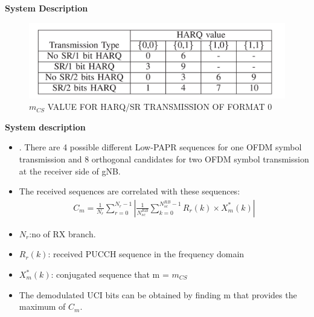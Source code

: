 \documentclass{beamer}
\begin{document}
\begin{frame}{\textbf{System Description}}
\begin{figure}
    \centering
    \includegraphics[scale=0.28 ]{MCS.png}
    \caption{$m_{CS}$ VALUE FOR HARQ/SR TRANSMISSION OF FORMAT 0}
\end{figure}
\end{frame}

\begin{frame}{\textbf{System description}}
\begin{itemize}
    \item . There are 4 possible different Low-PAPR sequences for one OFDM symbol transmission and 8 orthogonal candidates for two OFDM symbol transmission at the receiver side of gNB.
    \item  The received sequences are correlated with these sequences:
    \begin{align}
        C_{m}=\frac{1}{N_{r}}\sum_{r=0}^{N_{r}-1}\left| \frac{1}{N^{RB}_{sc}}\sum_{k=0}^{N^{RB}_{sc}-1}R_{r}(k)\times X_{m}^{*}(k)\right|
    \end{align}
\item $N_{r}$:no of RX branch.
\item  $R_{r}(k)$: received PUCCH sequence in the frequency domain
\item $ X_{m}^{*}(k)$:  conjugated sequence that m = $m_{CS}$
\item The demodulated UCI bits can be obtained by finding m that provides the maximum of $C_{m}$.
\end{itemize}
\end{frame}
   
\end{document}
